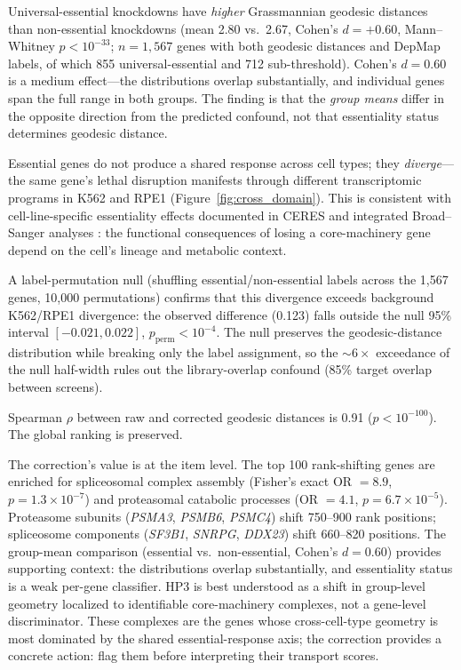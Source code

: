 \documentclass[11pt]{article}
\begin{document}
Universal-essential knockdowns have \emph{higher} Grassmannian geodesic
distances than non-essential knockdowns (mean 2.80 vs.\ 2.67, Cohen's $d =
+0.60$, Mann--Whitney $p < 10^{-33}$; $n = 1{,}567$ genes with both
geodesic distances and DepMap labels, of which 855 universal-essential and
712 sub-threshold). Cohen's $d = 0.60$ is a medium effect---the
distributions overlap substantially, and individual genes span the full
range in both groups. The finding is that the \emph{group means} differ
in the opposite direction from the predicted confound, not that essentiality
status determines geodesic distance.

Essential genes do not produce a shared response across cell types; they
\emph{diverge}---the same gene's lethal disruption manifests through
different transcriptomic programs in K562 and RPE1
(Figure~\ref{fig:cross_domain}). This is consistent with cell-line-specific
essentiality effects documented in CERES \citep{meyers2017ceres} and
integrated Broad--Sanger analyses \citep{pacini2021integrated}: the
functional consequences of losing a core-machinery gene depend on
the cell's lineage and metabolic context.

A label-permutation null (shuffling essential/non-essential labels across
the 1{,}567 genes, 10{,}000 permutations) confirms that this divergence
exceeds background K562/RPE1 divergence: the observed difference (0.123)
falls outside the null 95\% interval $[-0.021, 0.022]$,
$p_{\text{perm}} < 10^{-4}$. The null preserves the geodesic-distance
distribution while breaking only the label assignment, so the ${\sim}6\times$
exceedance of the null half-width rules out the library-overlap confound
(85\% target overlap between screens).

Spearman $\rho$ between raw and corrected geodesic distances is 0.91
($p < 10^{-100}$). The global ranking is preserved.

The correction's value is at the item level. The top 100 rank-shifting
genes are enriched for spliceosomal complex assembly (Fisher's exact
OR $= 8.9$, $p = 1.3 \times 10^{-7}$) and proteasomal catabolic
processes (OR $= 4.1$, $p = 6.7 \times 10^{-5}$). Proteasome subunits
(\emph{PSMA3}, \emph{PSMB6}, \emph{PSMC4}) shift 750--900 rank positions;
spliceosome components (\emph{SF3B1}, \emph{SNRPG}, \emph{DDX23}) shift
660--820 positions. The group-mean comparison (essential vs.\ non-essential,
Cohen's $d = 0.60$) provides supporting context: the distributions overlap
substantially, and essentiality status is a weak per-gene classifier.
HP3 is best understood as a shift in group-level geometry localized to
identifiable core-machinery complexes, not a gene-level discriminator.
These complexes are the genes whose cross-cell-type geometry is most
dominated by the shared essential-response axis; the correction provides a
concrete action: flag them before interpreting their transport scores.
\end{document}
